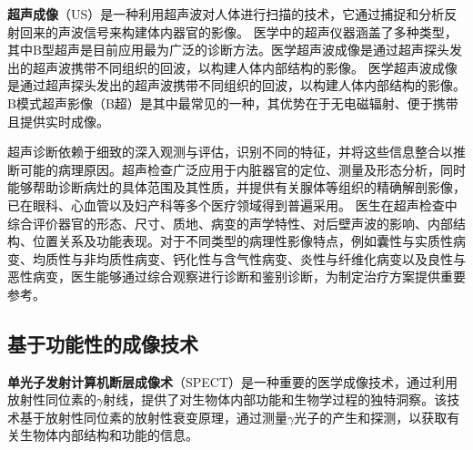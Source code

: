\textbf{超声成像}（US）\cite{newman1998history}是一种利用超声波对人体进行扫描的技术，它通过捕捉和分析反射回来的声波信号来构建体内器官的影像。
医学中的超声仪器涵盖了多种类型，其中B型超声是目前应用最为广泛的诊断方法。医学超声波成像是通过超声探头发出的超声波携带不同组织的回波，以构建人体内部结构的影像。
医学超声波成像是通过超声探头发出的超声波携带不同组织的回波，以构建人体内部结构的影像。B模式超声影像（B超）是其中最常见的一种，其优势在于无电磁辐射、便于携带且提供实时成像。

超声诊断依赖于细致的深入观测与评估，识别不同的特征，并将这些信息整合以推断可能的病理原因。超声检查广泛应用于内脏器官的定位、测量及形态分析，同时能够帮助诊断病灶的具体范围及其性质，并提供有关腺体等组织的精确解剖影像，已在眼科、心血管以及妇产科等多个医疗领域得到普遍采用。
医生在超声检查中综合评价器官的形态、尺寸、质地、病变的声学特性、对后壁声波的影响、内部结构、位置关系及功能表现。对于不同类型的病理性影像特点，例如囊性与实质性病变、均质性与非均质性病变、钙化性与含气性病变、炎性与纤维化病变以及良性与恶性病变，医生能够通过综合观察进行诊断和鉴别诊断，为制定治疗方案提供重要参考。

\subsection{基于功能性的成像技术}
\textbf{单光子发射计算机断层成像术}（SPECT）\cite{jaszczak1980spect}是一种重要的医学成像技术，通过利用放射性同位素的$\gamma$射线，提供了对生物体内部功能和生物学过程的独特洞察。该技术基于放射性同位素的放射性衰变原理，通过测量$\gamma$光子的产生和探测，以获取有关生物体内部结构和功能的信息。

